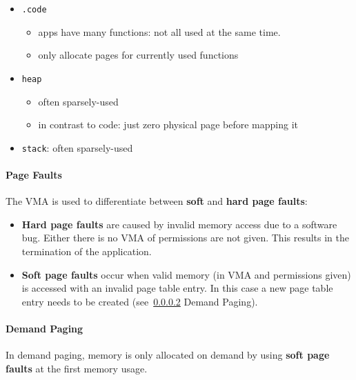 \newpar{}
\begin{itemize}
    \item \texttt{.code}
          \begin{itemize}
              \item apps have many functions: not all used at the same time.
              \item only allocate pages for currently used functions
          \end{itemize}
    \item \texttt{heap}
          \begin{itemize}
              \item often sparsely-used
              \item in contrast to code: just zero physical page before mapping it
          \end{itemize}
    \item \texttt{stack}: often sparsely-used
\end{itemize}

\paragraph{Page Faults}
The VMA is used to differentiate between \textbf{soft} and \textbf{hard page faults}:
\begin{itemize}
    \item \textbf{Hard page faults} are caused by invalid memory access due to a software bug. Either there is no VMA of permissions are not given. This results in the termination of the application.
    \item \textbf{Soft page faults} occur when valid memory (in VMA and permissions given) is accessed with an invalid page table entry. In this case a new page table entry needs to be created (see~\ref{page demanding} Demand Paging).
\end{itemize}



\paragraph{Demand Paging}\label{page demanding}
In demand paging, memory is only allocated on demand by using \textbf{soft page faults} at the first memory usage.

\newpar{}

